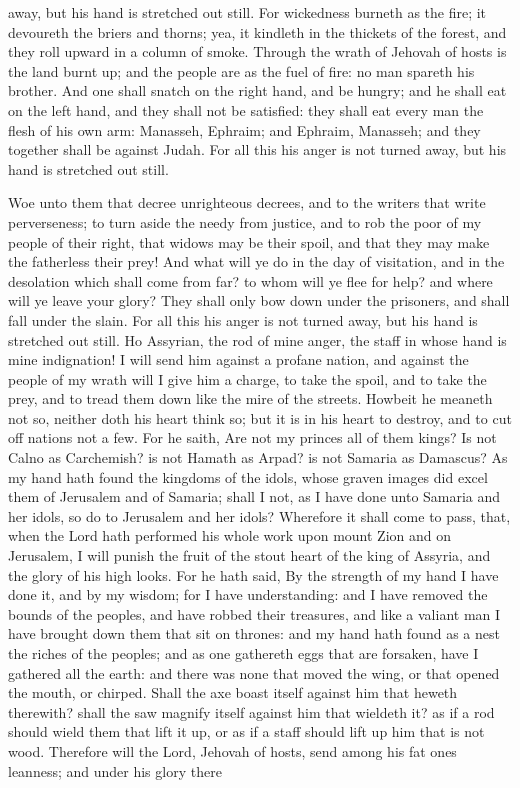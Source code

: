 away, but his hand is stretched out still.  For wickedness burneth as the fire; it devoureth the briers and thorns; yea, it kindleth in the thickets of the forest, and they roll upward in a column of smoke. Through the wrath of Jehovah of hosts is the land burnt up; and the people are as the fuel of fire: no man spareth his brother. And one shall snatch on the right hand, and be hungry; and he shall eat on the left hand, and they shall not be satisfied: they shall eat every man the flesh of his own arm: Manasseh, Ephraim; and Ephraim, Manasseh; and they together shall be against Judah. For all this his anger is not turned away, but his hand is stretched out still. 

Woe unto them that decree unrighteous decrees, and to the writers that write perverseness; to turn aside the needy from justice, and to rob the poor of my people of their right, that widows may be their spoil, and that they may make the fatherless their prey! And what will ye do in the day of visitation, and in the desolation which shall come from far? to whom will ye flee for help? and where will ye leave your glory? They shall only bow down under the prisoners, and shall fall under the slain. For all this his anger is not turned away, but his hand is stretched out still.  Ho Assyrian, the rod of mine anger, the staff in whose hand is mine indignation! I will send him against a profane nation, and against the people of my wrath will I give him a charge, to take the spoil, and to take the prey, and to tread them down like the mire of the streets. Howbeit he meaneth not so, neither doth his heart think so; but it is in his heart to destroy, and to cut off nations not a few. For he saith, Are not my princes all of them kings? Is not Calno as Carchemish? is not Hamath as Arpad? is not Samaria as Damascus? As my hand hath found the kingdoms of the idols, whose graven images did excel them of Jerusalem and of Samaria; shall I not, as I have done unto Samaria and her idols, so do to Jerusalem and her idols?  Wherefore it shall come to pass, that, when the Lord hath performed his whole work upon mount Zion and on Jerusalem, I will punish the fruit of the stout heart of the king of Assyria, and the glory of his high looks. For he hath said, By the strength of my hand I have done it, and by my wisdom; for I have understanding: and I have removed the bounds of the peoples, and have robbed their treasures, and like a valiant man I have brought down them that sit on thrones: and my hand hath found as a nest the riches of the peoples; and as one gathereth eggs that are forsaken, have I gathered all the earth: and there was none that moved the wing, or that opened the mouth, or chirped.  Shall the axe boast itself against him that heweth therewith? shall the saw magnify itself against him that wieldeth it? as if a rod should wield them that lift it up, or as if a staff should lift up him that is not wood. Therefore will the Lord, Jehovah of hosts, send among his fat ones leanness; and under his glory there 